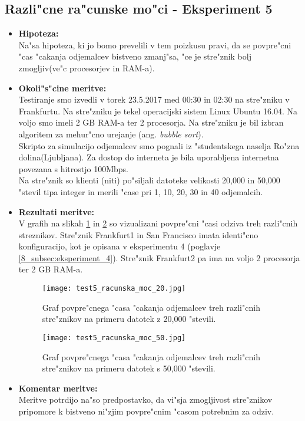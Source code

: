 \subsection{Razli"cne ra"cunske mo"ci - Eksperiment 5}
\begin{itemize}
	\item \textbf{Hipoteza: }  \\
		Na"sa hipoteza, ki jo bomo prevelili v tem poizkusu pravi, da se povpre"cni "cas "cakanja odjemalcev bistveno zmanj"sa, "ce je stre"znik bolj zmogljiv(ve"c procesorjev in RAM-a).
			
	\item \textbf{Okoli"s"cine meritve: } \\
		Testiranje smo izvedli v torek 23.5.2017 med 00:30 in 02:30 na stre"zniku v Frankfurtu. Na stre"zniku je tekel operacijski sistem Linux Ubuntu 16.04. Na voljo smo imeli 2 GB RAM-a ter 2 procesorja. Na stre"zniku je bil izbran algoritem za mehur"cno urejanje (ang. \textit{bubble sort}).\\ Skripto za simulacijo odjemalcev smo pognali iz "studentskega naselja Ro"zna dolina(Ljubljana). Za dostop do interneta je bila uporabljena internetna povezana s hitrostjo 100Mbps.\\ Na stre"znik so klienti (niti) po"siljali datoteke velikosti 20,000 in 50,000 "stevil tipa integer in merili "case pri 1, 10, 20, 30 in 40 odjemalcih.

 	\item \textbf{Rezultati meritve: }  \\
 	
		V grafih na slikah \ref{8_graf_racunska_moc_20} in \ref{8_graf_racunska_moc_50} so vizualizani povpre"cni "casi odziva treh razli"cnih streznikov. Stre"znik Frankfurt1 in San Francisco imata identi"cno konfiguracijo, kot je opisana v eksperimentu 4 (poglavje \ref{8_subsec:eksperiment_4}). Stre"znik Frankfurt2 pa ima na voljo 2 procesorja ter 2 GB RAM-a.
		
		\begin{figure}[h]
  		\centering
  		  \texttt{[image: test5\_racunska\_moc\_20.jpg]}
  		\caption{Graf povpre"cnega "casa "cakanja odjemalcev treh razli"cnih stre"znikov na primeru datotek z 20,000 "stevili.}
  		\label{8_graf_racunska_moc_20}
		\end{figure}

	\begin{figure}[h]
  		\centering
  		  \texttt{[image: test5\_racunska\_moc\_50.jpg]}
  		\caption{Graf povpre"cnega "casa "cakanja odjemalcev treh razli"cnih stre"znikov na primeru datotek s 50,000 "stevili.}
  		\label{8_graf_racunska_moc_50}
		\end{figure}
	\item \textbf{Komentar meritve: } \\ 
		Meritve potrdijo na"so predpostavko, da vi"sja zmogljivost stre"znikov pripomore k bistveno ni"zjim povpre"cnim "casom potrebnim za odziv.
\end{itemize}

